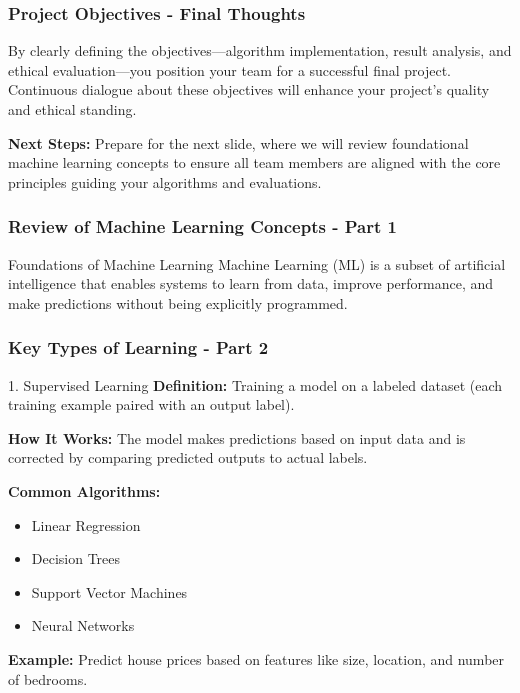 \documentclass[aspectratio=169]{beamer}
\begin{document}
\begin{frame}[fragile]
    \frametitle{Project Objectives - Final Thoughts}
    By clearly defining the objectives—algorithm implementation, result analysis, and ethical evaluation—you position your team for a successful final project. Continuous dialogue about these objectives will enhance your project's quality and ethical standing.
    
    \textbf{Next Steps:} Prepare for the next slide, where we will review foundational machine learning concepts to ensure all team members are aligned with the core principles guiding your algorithms and evaluations.
\end{frame}

\begin{frame}[fragile]
    \frametitle{Review of Machine Learning Concepts - Part 1}
    \begin{block}{Foundations of Machine Learning}
        Machine Learning (ML) is a subset of artificial intelligence that enables systems to learn from data, improve performance, and make predictions without being explicitly programmed.
    \end{block}
\end{frame}

\begin{frame}[fragile]
    \frametitle{Key Types of Learning - Part 2}
    \begin{block}{1. Supervised Learning}
        \textbf{Definition:} Training a model on a labeled dataset (each training example paired with an output label).

        \textbf{How It Works:} 
        The model makes predictions based on input data and is corrected by comparing predicted outputs to actual labels.
        
        \textbf{Common Algorithms:} 
        \begin{itemize}
            \item Linear Regression
            \item Decision Trees
            \item Support Vector Machines
            \item Neural Networks
        \end{itemize}

        \textbf{Example:} Predict house prices based on features like size, location, and number of bedrooms.
    \end{block}
\end{frame}
\end{document}
